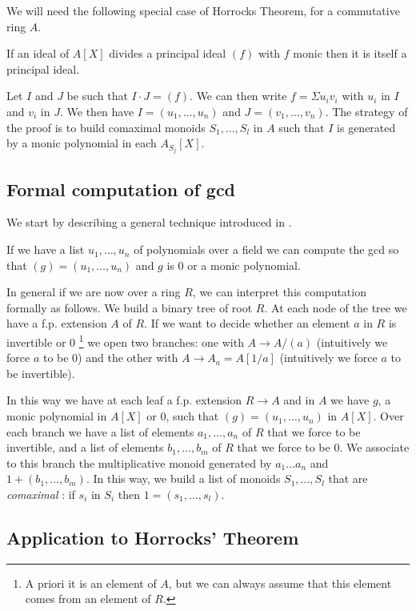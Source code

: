 We will need the following special case of Horrocks Theorem, for a commutative ring $A$.

\begin{lemma}\label{Horrocks}
  If an ideal of $A[X]$ divides a principal ideal $(f)$ with $f$ monic then it is itself a principal ideal.
\end{lemma}

Let $I$ and $J$ be such that $I\cdot J = (f)$. We can then write $f = \Sigma u_iv_i$ with $u_i$ in $I$ and
$v_i$ in $J$. We then have $I = (u_1,\dots,u_n)$ and $J=(v_1,\dots,v_n)$.
The strategy of the proof is to build comaximal monoids $S_1,\dots,S_l$ in $A$ \cite{LQ} such
that $I$ is generated by a monic polynomial in each $A_{S_j}[X]$.

\subsection{Formal computation of gcd}

 We start by describing a general technique introduced in \cite{LQ}.

If we have a list $u_1,\dots,u_n$ of polynomials over a field we can compute the gcd
so that $(g) = (u_1,\dots,u_n)$ and $g$ is $0$ or a monic polynomial.

In general if we are now over a ring $R$, we can interpret this computation formally as
follows. We build a binary tree of root $R$. At each node of the tree we have a f.p. extension $A$
of $R$. If we want to decide whether an element $a$ in $R$ is invertible or $0$
\footnote{A priori it is an element
of $A$, but we can always assume that this element comes from an element of $R$.}
we open two branches: one with $A\rightarrow A/(a)$ (intuitively we force $a$ to be $0$)
and the other with $A\rightarrow A_a = A[1/a]$ (intuitively we force $a$ to be invertible).

In this way we have at each leaf a f.p. extension $R\rightarrow A$ and in $A$ we have
$g$, a monic polynomial in $A[X]$ or $0$, such that $(g) = (u_1,\dots,u_n)$ in $A[X]$.
Over each branch we have a list of elements $a_1,\dots,a_n$ of $R$ that we force to be
invertible, and a list of elements $b_1,\dots,b_m$ of $R$ that we force to be $0$.
We associate to this branch the multiplicative monoid generated by $a_1\dots a_n$
and $1 + (b_1,\dots,b_m)$. In this way, we build a list of monoids $S_1,\dots,S_l$
that are {\em comaximal} \cite{LQ}: if $s_i$ in $S_i$ then $1 = (s_1,\dots,s_l)$.

\subsection{Application to Horrocks' Theorem}

